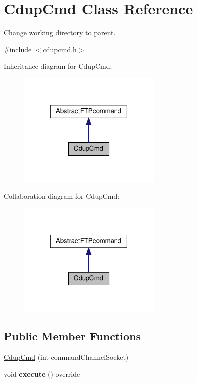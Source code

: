 \hypertarget{classCdupCmd}{}\section{Cdup\+Cmd Class Reference}
\label{classCdupCmd}


Change working directory to parent.  




{\ttfamily \#include $<$cdupcmd.\+h$>$}



Inheritance diagram for Cdup\+Cmd\+:\nopagebreak
\begin{figure}[H]
\begin{center}
\leavevmode
\includegraphics[width=195pt]{de/dbd/classCdupCmd__inherit__graph}
\end{center}
\end{figure}


Collaboration diagram for Cdup\+Cmd\+:\nopagebreak
\begin{figure}[H]
\begin{center}
\leavevmode
\includegraphics[width=195pt]{d3/dc6/classCdupCmd__coll__graph}
\end{center}
\end{figure}
\subsection*{Public Member Functions}
\begin{DoxyCompactItemize}
\item 
\hyperlink{classCdupCmd_aeb8d70fa7fd7a90dcf1571a50f829b41}{Cdup\+Cmd} (int command\+Channel\+Socket)
\item 
\mbox{\label{classCdupCmd_a84e58f19f01e92852f2dbb4849065059}} 
void {\bfseries execute} () override
\end{DoxyCompactItemize}
